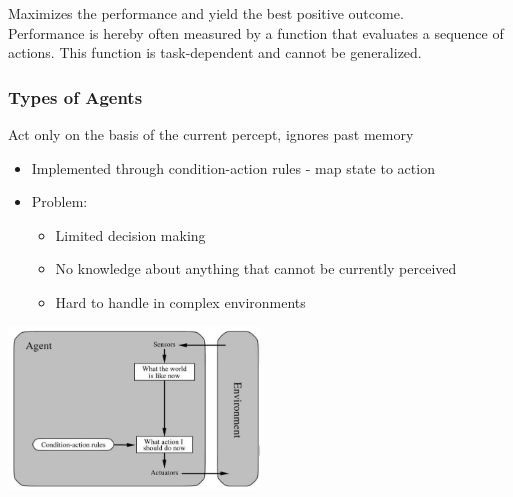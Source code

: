 \documentclass[
../../EiKI_Summary.tex,
]
{subfiles}
\begin{document}
\begin{defbox}
    Maximizes the performance and yield the best positive outcome. \\
    Performance is hereby often measured by a function that evaluates a sequence of actions. This function is task-dependent and cannot be generalized.
\end{defbox}

\subsubsection{Types of Agents}

\begin{defbox}
    Act only on the basis of the current percept, ignores past memory
    \begin{itemize}
        \item Implemented through condition-action rules - map state to action
        \item Problem:
        \begin{itemize}
            \item Limited decision making
            \item No knowledge about anything that cannot be currently perceived
            \item Hard to handle in complex environments
        \end{itemize}
    \end{itemize}
    
    \begin{center}
        \includegraphics[width=0.5\textwidth]{Pics/ReflexAgent.png}
    \end{center}
\end{defbox}
\end{document}
